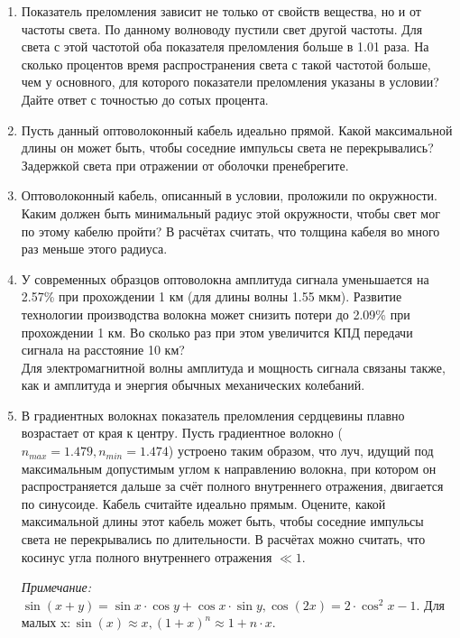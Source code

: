 \begin{enumerate}
\item Показатель преломления зависит не только от свойств вещества, но и от частоты света. По данному волноводу пустили свет другой частоты. Для света с этой частотой оба показателя преломления больше в 1.01 раза. На сколько процентов время распространения света с такой частотой больше, чем у основного, для которого показатели преломления указаны в условии? Дайте ответ с точностью до сотых процента.
\item Пусть данный оптоволоконный кабель идеально прямой. Какой максимальной длины он может быть, чтобы соседние импульсы света не перекрывались? Задержкой света при отражении от оболочки пренебрегите. 
\item Оптоволоконный кабель, описанный в условии, проложили по окружности. Каким должен быть минимальный радиус этой окружности, чтобы свет мог по этому кабелю пройти? В расчётах считать, что толщина кабеля во много раз меньше этого радиуса.
\item У современных образцов оптоволокна амплитуда сигнала уменьшается на  2.57\% при прохождении 1 км (для длины волны 1.55 мкм). Развитие технологии производства волокна может снизить потери до 2.09\% при прохождении 1 км.  Во сколько раз при этом увеличится КПД передачи сигнала на расстояние 10 км?\\
Для электромагнитной волны амплитуда и мощность сигнала связаны также, как и амплитуда и энергия обычных механических колебаний. 
\item В градиентных волокнах показатель преломления сердцевины плавно возрастает от края к центру. Пусть 
градиентное волокно ($n_{max} = 1.479, n_{min} = 1.474$) устроено таким образом, что луч, идущий под 
максимальным допустимым углом к направлению волокна, при котором он распространяется дальше за счёт полного 
внутреннего отражения, двигается по синусоиде.  Кабель считайте идеально прямым. Оцените, какой максимальной 
длины этот кабель может быть, чтобы соседние импульсы света не перекрывались по длительности. В расчётах можно 
считать, что косинус угла полного внутреннего отражения $\ll 1$.

\textit{Примечание:} $\sin(x+y)=\sin{x}\cdot\cos{y}+\cos{x}\cdot\sin{y}, \cos(2x)=2\cdot\cos^2x-1$.
Для малых x$: \sin(x)\approx x,   (1+x)^n\approx1+n\cdot x$.

\end{enumerate}
